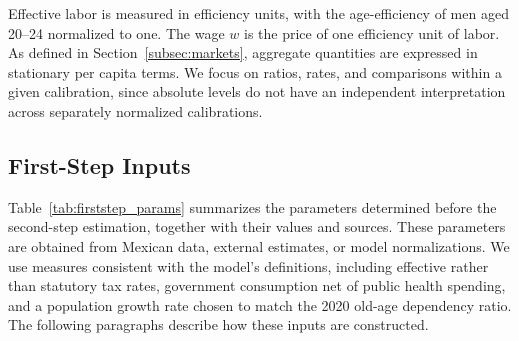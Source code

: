 \documentclass[12pt,a4paper]{article}
\begin{document}
Effective labor is measured in efficiency units, with the age-efficiency of men aged 20--24 normalized to one. The wage $w$ is the price of one efficiency unit of labor. As defined in Section~\ref{subsec:markets}, aggregate quantities are expressed in stationary per capita terms. We focus on ratios, rates, and comparisons within a given calibration, since absolute levels do not have an independent interpretation across separately normalized calibrations.


\subsection{First-Step Inputs}
\label{subsec:firststep}

Table~\ref{tab:firststep_params} summarizes the parameters determined before the second-step estimation, together with their values and sources. These parameters are obtained from Mexican data, external estimates, or model normalizations. We use measures consistent with the model's definitions, including effective rather than statutory tax rates, government consumption net of public health spending, and a population growth rate chosen to match the 2020 old-age dependency ratio. The following paragraphs describe how these inputs are constructed.
\end{document}
